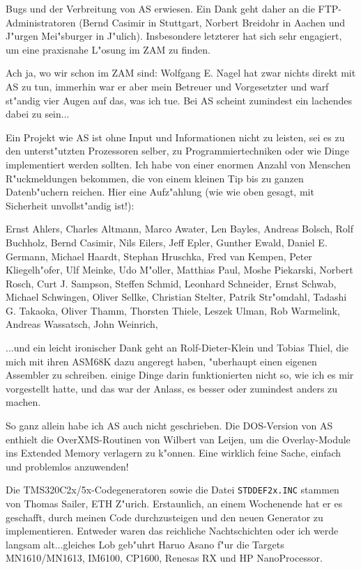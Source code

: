 \documentclass[12pt,a4paper,twoside]{report}
\newcommand{\tty}[1]{{\tt #1}}
\newcommand{\asname}{AS}
\begin{document}
Bugs und der Verbreitung von \asname{} erwiesen.  Ein Dank geht daher an
die FTP-Administratoren (Bernd Casimir in Stuttgart, Norbert Breidohr
in Aachen und J"urgen Mei"sburger in J"ulich).  Insbesondere letzterer
hat sich sehr engagiert, um eine praxisnahe L"osung im ZAM zu
finden.
\par
Ach ja, wo wir schon im ZAM sind: Wolfgang E. Nagel hat zwar nichts
direkt mit \asname{} zu tun, immerhin war er aber mein Betreuer und
Vorgesetzter und warf
st"andig vier Augen auf das, was ich tue.  Bei \asname{} scheint zumindest
ein lachendes dabei zu sein...
\par
Ein Projekt wie \asname{} ist ohne Input und Informationen nicht zu
leisten, sei es zu den unterst"utzten Prozessoren selber, zu
Programmiertechniken oder wie Dinge implementiert werden sollten.
Ich habe von einer enormen Anzahl von Menschen R"uckmeldungen
bekommen, die von einem kleinen Tip bis zu ganzen Datenb"uchern
reichen.  Hier eine Aufz"ahlung (wie wie oben gesagt, mit Sicherheit
unvollst"andig ist!):
\par
Ernst Ahlers, Charles Altmann, Marco Awater, Len Bayles, Andreas
Bolsch, Rolf Buchholz, Bernd Casimir, Nils Eilers, Jeff Epler, Gunther Ewald,
Daniel E. Germann, Michael Haardt, Stephan Hruschka, Fred van
Kempen, Peter Kliegelh"ofer, Ulf Meinke, Udo M"oller, Matthias
Paul, Moshe Piekarski, Norbert Rosch, Curt J.  Sampson, Steffen Schmid,
Leonhard Schneider, Ernst Schwab, Michael Schwingen, Oliver Sellke,
Christian Stelter, Patrik Str"omdahl, Tadashi G. Takaoka, Oliver
Thamm, Thorsten Thiele, Leszek Ulman, Rob Warmelink, Andreas
Wassatsch, John Weinrich,
\par
...und ein leicht ironischer Dank geht an Rolf-Dieter-Klein und Tobias Thiel, die
mich mit ihren ASM68K dazu angeregt haben, "uberhaupt einen eigenen
Assembler zu schreiben.  einige Dinge darin funktionierten nicht so,
wie ich es mir vorgestellt hatte, und das war der Anlass, es besser
oder zumindest anders zu machen.
\par
So ganz allein habe ich \asname{} auch nicht geschrieben.  Die DOS-Version
von \asname{} enthielt die OverXMS-Routinen von Wilbert van Leijen,
um die Overlay-Module ins Extended Memory verlagern zu k"onnen.  Eine
wirklich feine Sache, einfach und problemlos anzuwenden!
\par
Die TMS320C2x/5x-Codegeneratoren sowie die Datei \tty{STDDEF2x.INC}
stammen von Thomas Sailer, ETH Z"urich.  Erstaunlich, an einem Wochenende
hat er es geschafft, durch meinen Code durchzusteigen und den neuen
Generator zu implementieren.  Entweder waren das reichliche Nachtschichten
oder ich werde langsam alt...gleiches Lob geb"uhrt Haruo Asano f"ur
die Targets MN1610/MN1613, IM6100, CP1600, Renesas RX und HP
NanoProcessor.
\end{document}
